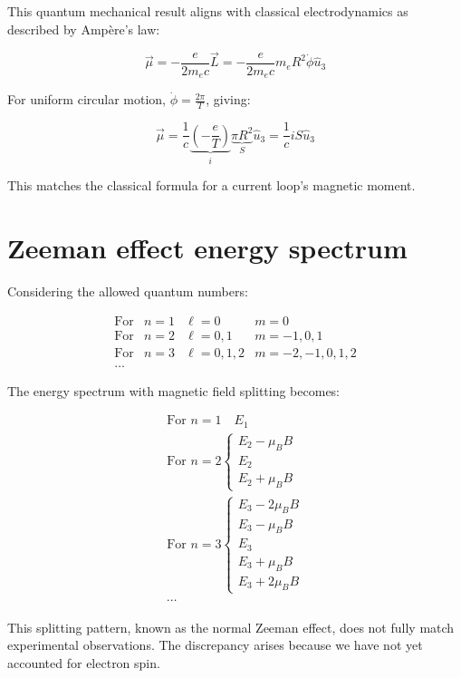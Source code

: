 This quantum mechanical result aligns with classical electrodynamics as described by Ampère's law:

\begin{equation}
\vec{\mu}=-\frac{e}{2m_e c}\vec{L}=-\frac{e}{2m_e c}m_e R^2\dot{\phi}\hat{u}_3
\end{equation}

For uniform circular motion, $\dot{\phi}=\frac{2\pi}{T}$, giving:

\begin{equation}
\vec{\mu}=\frac{1}{c}\underbrace{\left(-\frac{e}{T}\right)}_i \underbrace{\pi R^2}_S \hat{u}_3=\frac{1}{c}iS\hat{u}_3
\end{equation}

This matches the classical formula for a current loop's magnetic moment.

\section{Zeeman effect energy spectrum}
Considering the allowed quantum numbers:

$$
\begin{array}{llll}
\text{For} & n=1 & \ell=0 & m=0 \\
\text{For} & n=2 & \ell=0,1 & m=-1,0,1 \\
\text{For} & n=3 & \ell=0,1,2 & m=-2,-1,0,1,2 \\
\ldots & & &
\end{array}
$$

The energy spectrum with magnetic field splitting becomes:

\begin{gather}
\text{For } n=1 \quad E_1 \\
\text{For } n=2\left\{\begin{array}{l}
E_2-\mu_B B \\
E_2 \\
E_2+\mu_B B
\end{array}\right. \\
\text{For } n=3\left\{\begin{array}{l}
E_3-2\mu_B B \\
E_3-\mu_B B \\
E_3 \\
E_3+\mu_B B \\
E_3+2\mu_B B
\end{array}\right. \\
\cdots
\end{gather}

This splitting pattern, known as the normal Zeeman effect, does not fully match experimental observations. The discrepancy arises because we have not yet accounted for electron spin.

